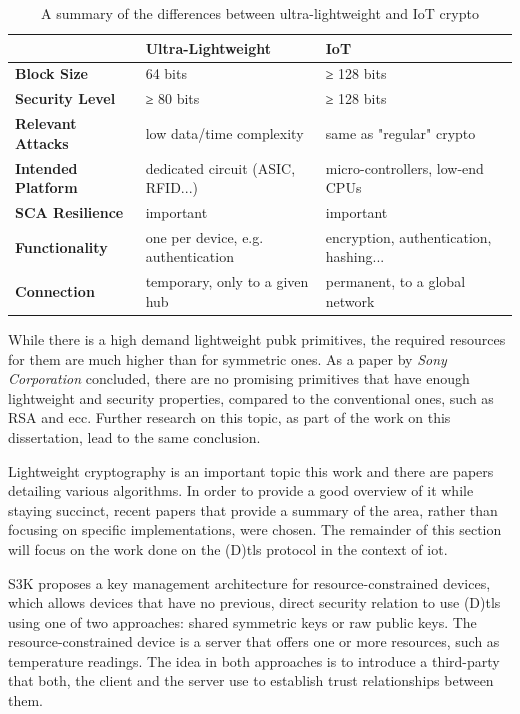 \documentclass{llncs}
\begin{document}
\begin{table}[]
\centering
\caption{A summary of the differences between ultra-lightweight and IoT crypto}
\label{ul-iot}
\begin{tabular}{@{}lll@{}}
\toprule
                           & \textbf{Ultra-Lightweight}          & \textbf{IoT}                           \\ \midrule
\textbf{Block Size}        & 64 bits                             & ≥ 128 bits                             \\
\textbf{Security Level}    & ≥ 80 bits                           & ≥ 128 bits                             \\
\textbf{Relevant Attacks}  & low data/time complexity            & same as "regular" crypto               \\
\textbf{Intended Platform} & dedicated circuit (ASIC, RFID...)   & micro-controllers, low-end CPUs        \\
\textbf{SCA Resilience}    & important                           & important                              \\
\textbf{Functionality}     & one per device, e.g. authentication & encryption, authentication, hashing... \\
\textbf{Connection}        & temporary, only to a given hub      & permanent, to a global network         \\ \bottomrule
\end{tabular}
\end{table}

While there is a high demand lightweight \gls{pubk} primitives, the required
resources for them are much higher than for symmetric ones. As a
paper by \textit{Sony Corporation}\cite{b5b8db9716:online}
concluded, there are no promising primitives
that have enough lightweight and security properties, compared to the
conventional ones, such as RSA and \gls{ecc}. Further research on this topic, as part of the work on this dissertation, lead to the same conclusion.

Lightweight cryptography is an important topic this work and there are papers detailing
various algorithms. In order to provide a good overview of it while staying succinct, recent papers that provide a summary of the
area, rather than focusing on specific implementations, were chosen.
The remainder of this section will focus on the work done on the (D)\gls{tls} protocol in the context of \gls{iot}.

S3K\cite{S3KScala62:online} proposes a key management architecture for resource-constrained devices,
which allows devices that have no previous, direct security relation to use
(D)\gls{tls} using one of two approaches: shared symmetric keys or raw public keys.
The resource-constrained device is a server that offers one or more resources,
such as temperature readings. The idea in both approaches is to introduce a third-party
 that both, the client and the server use to establish
trust relationships between them.
\end{document}
